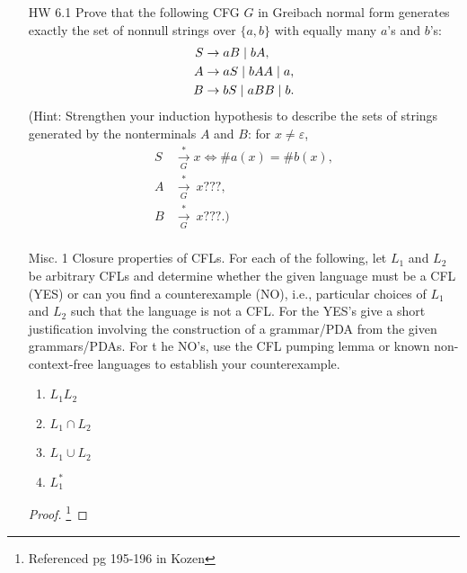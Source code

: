 \documentclass{article}
\newcommand{\setst}{\hspace{1mm} | \hspace{1mm} }
\renewcommand{\epsilon}{\varepsilon}
\theoremstyle{definition}
\begin{document}
\begin{enumerate}
\begin{proof}
		Case 2: There is no proper prefix of $x$ that satisfies $(*)$. Then, either $x = azb$ or $x = bza$. We can see that $z$ satisfies $(*)$ since
		\[\#a(z) = \#a(x)-1 = \#b(x)-1=\#b(z).\]
		So, by the induction hypothesis, $S \xrightarrow[G]{*} z$. Then, if $x = azb$, we can derive $x$ in the following way:
		\[S \xrightarrow[G]{1} aSb \xrightarrow[G]{*} azb = x.\]
		 If $x = bza$, we can derive $x$ in the following way:
		\[S \xrightarrow[G]{1} bSa \xrightarrow[G]{*} bza = x.\]
		In both cases, we have shown that if $x$ satisfies $(*)$, then $S \xrightarrow[G]{*} x$. 
	\end{proof}
	\item[HW 6.1] Prove that the following CFG $G$ in Greibach normal form generates
	exactly the set of nonnull strings over $\{a, b\}$ with equally many $a$'s and
	$b$'s:
	\begin{align*}
	S &\rightarrow aB \setst bA, \\
	A &\rightarrow aS \setst bAA \setst a, \\
	B &\rightarrow bS \setst aBB \setst b.
	\end{align*}
	(Hint: Strengthen your induction hypothesis to describe the sets of
	strings generated by the nonterminals $A$ and $B$: for $x \neq \epsilon$,
	\begin{align*}
	S &\xrightarrow[G]{*} x \iff \#a(x) = \#b(x),\\
	A &\xrightarrow[G]{*}\ x ???,\\
	B &\xrightarrow[G]{*}\ x ???.)\\
	\end{align*}
	\item[Misc. 1]
	Closure properties of CFLs. For each of the following, let $L_1$ and $L_2$ be arbitrary CFLs and determine whether the given language must be a CFL (YES) or can you find a counterexample (NO), i.e., particular choices of $L_1$ and $L_2$ such that the language is not a CFL. For the YES's give a short justification involving the construction of a grammar/PDA from the given grammars/PDAs. For t he NO's, use the CFL pumping lemma or known non-context-free languages to establish your counterexample.
	\begin{enumerate}
		\item $L_1L_2$
		\item $L_1 \cap L_2$
		\item $L_1 \cup L_2$ 
		\item $L_1^*$
	\end{enumerate} 
\begin{proof}\footnote{Referenced pg 195-196 in Kozen}

\end{proof}
\end{enumerate}
\end{document}

